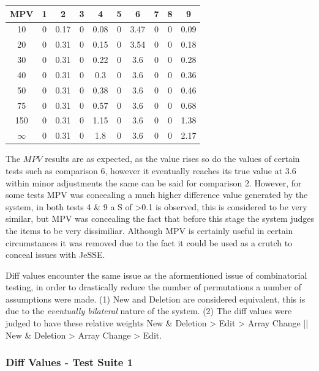 \documentclass[jou,apacite]{apa6}
\begin{document}
\begin{center}
 \begin{tabular}{||c c c c c c c c c c||} 
 \hline
 MPV  & 1 & 2 & 3 & 4 & 5 & 6 & 7 & 8 & 9 \\ [0.5ex] 
 \hline\hline
 10 & 0 & 0.17 & 0 & 0.08 & 0 & 3.47 & 0 & 0 & 0.09 \\ 
 \hline
 20 & 0 & 0.31 & 0 & 0.15 & 0 & 3.54 & 0 & 0 & 0.18 \\ 
 \hline
 30 & 0 & 0.31 & 0 & 0.22 & 0 & 3.6 & 0 & 0 & 0.28 \\ 
 \hline
  40 & 0 & 0.31 & 0 & 0.3 & 0 & 3.6 & 0 & 0 & 0.36 \\ 
  \hline
    50 & 0 & 0.31 & 0 & 0.38 & 0 & 3.6 & 0 & 0 & 0.46 \\ 
  \hline
   75 & 0 & 0.31 & 0 & 0.57 & 0 & 3.6 & 0 & 0 & 0.68 \\ 
  \hline
  150 & 0 & 0.31 & 0 & 1.15 & 0 & 3.6 & 0 & 0 & 1.38 \\ 
  \hline
  $\infty$ & 0 & 0.31 & 0 & 1.8 & 0 & 3.6 & 0 & 0 & 2.17 \\ 
  \hline
  
\end{tabular}
\end{center}

The $MPV$ results are as expected, as the value rises so do the values of certain tests such as comparison 6, however it eventually reaches its true value at 3.6 within minor adjustments the same can be said for comparison 2. However, for some tests MPV was concealing a much higher difference value generated by the system, in both tests 4 \& 9 a S of >0.1  is observed, this is considered to be very similar, but MPV was concealing the fact that before this stage the system judges the items to be  very dissimiliar. Although MPV is certainly useful in certain circumstances it was removed due to the fact it could be used as a crutch to conceal issues with JeSSE. 

Diff values encounter the same issue as the aformentioned issue of combinatorial testing, in order to drastically reduce the number of permutations a number of assumptions were made. (1) New and Deletion are considered equivalent, this is due to the \textit{eventually bilateral} nature of the system. (2) The diff values were judged to have these relative weights New \& Deletion > Edit > Array Change || New \& Deletion > Array Change > Edit.

\subsubsection{Diff Values - Test Suite 1}
\end{document}
